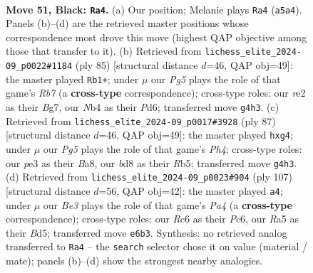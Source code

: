 \documentclass[11pt]{article}
\begin{document}
\clearpage

\begin{figure}[p]\centering
\begin{subfigure}{0.46\textwidth}\centering
\resizebox{\linewidth}{!}{%
\newchessgame
\chessboard[
  setfen={1R1B4/5k2/2r1b3/rp6/1n4p1/4P1PP/4RP1K/8 b - - 3 51},
  showmover=false,
  pgfstyle=straightmove, color=movearrow, markmove={a5-a4}
]}
\caption{}
\end{subfigure}\hfill
\begin{subfigure}{0.46\textwidth}\centering
\resizebox{\linewidth}{!}{%
\newchessgame
\chessboard[
  setfen={8/5rbk/3p3p/3P4/R4P2/2P3P1/pr3R1P/6K1 b - - 2 43},
  showmover=false,
  pgfstyle=straightmove, color=movearrow, markmove={b2-b1}
]}
\caption{}
\end{subfigure}
\\[4pt]
\begin{subfigure}{0.46\textwidth}\centering
\resizebox{\linewidth}{!}{%
\newchessgame
\chessboard[
  setfen={b5r1/2R3pk/2P5/1r5p/4p1P1/7P/1B1R1P1K/8 b - - 2 44},
  showmover=false,
  pgfstyle=straightmove, color=movearrow, markmove={h5-g4}
]}
\caption{}
\end{subfigure}\hfill
\begin{subfigure}{0.46\textwidth}\centering
\resizebox{\linewidth}{!}{%
\newchessgame
\chessboard[
  setfen={4k3/8/2p2B2/p1Pb1Rp1/6P1/3r1PK1/8/8 b - - 4 54},
  showmover=false,
  pgfstyle=straightmove, color=movearrow, markmove={a5-a4}
]}
\caption{}
\end{subfigure}
\caption{\textbf{Move 51, Black: \texttt{Ra4}.} (a) Our position; Melanie plays \texttt{Ra4} (\texttt{a5a4}). Panels (b)--(d) are the retrieved master positions whose correspondence most drove this move (highest QAP objective among those that transfer to it). (b) Retrieved from \texttt{lichess\_elite\_2024-09\_p0022\#1184} (ply 85) [structural distance $d$=46, QAP obj=49]: the master played \texttt{Rb1+}; under $\mu$ our \emph{Pg5} plays the role of that game's \emph{Rb7} (a \textbf{cross-type} correspondence); cross-type roles: our \emph{r}e2 as their \emph{B}g7, our \emph{N}b4 as their \emph{P}d6; transferred move \texttt{g4h3}. (c) Retrieved from \texttt{lichess\_elite\_2024-09\_p0017\#3928} (ply 87) [structural distance $d$=46, QAP obj=49]: the master played \texttt{hxg4}; under $\mu$ our \emph{Pg5} plays the role of that game's \emph{Ph4}; cross-type roles: our \emph{p}e3 as their \emph{B}a8, our \emph{b}d8 as their \emph{R}b5; transferred move \texttt{g4h3}. (d) Retrieved from \texttt{lichess\_elite\_2024-09\_p0023\#904} (ply 107) [structural distance $d$=56, QAP obj=42]: the master played \texttt{a4}; under $\mu$ our \emph{Be3} plays the role of that game's \emph{Pa4} (a \textbf{cross-type} correspondence); cross-type roles: our \emph{R}c6 as their \emph{P}c6, our \emph{R}a5 as their \emph{B}d5; transferred move \texttt{e6b3}. Synthesis: no retrieved analog transferred to \texttt{Ra4} -- the \texttt{search} selector chose it on value (material / mate); panels (b)--(d) show the strongest nearby analogies.}
\label{fig:thought-m101}
\end{figure}
\end{document}
